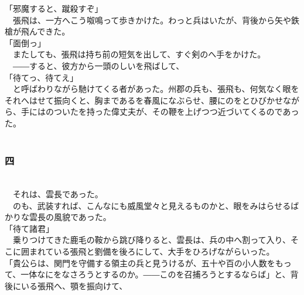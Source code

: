 \documentclass[
  paper=a5,
  fontsize=10pt,
  jafontsize=9.5pt,
  tate,                  %
  open_bracket_pos=nibu, %
]{jlreq}
\begin{document}
「邪魔すると、蹴殺すぞ」\\


　張飛は、一方へこう呶鳴って歩きかけた。わっと兵はいたが、背後から矢や鉄槍が飛んできた。\\


「面倒っ」\\


　またしても、張飛は持ち前の短気を出して、すぐ剣のへ手をかけた。\\


　――すると、彼方から一頭のしいを飛ばして、\\


「待てっ、待てえ」\\


　と呼ばわりながら馳けてくる者があった。州郡の兵も、張飛も、何気なく眼をそれへはせて振向くと、胸まであるを春風になぶらせ、腰にのをとひびかせながら、手にはのついたを持った偉丈夫が、その鞭を上げつつ近づいてくるのであった。\\

\\

\subsubsection{四}

\\


　それは、雲長であった。\\


　のも、武装すれば、こんなにも威風堂々と見えるものかと、眼をみはらせるばかりな雲長の風貌であった。\\


「待て諸君」\\


　乗りつけてきた鹿毛の鞍から跳び降りると、雲長は、兵の中へ割って入り、そこに囲まれている張飛と劉備を後ろにして、大手をひろげながらいった。\\


「貴公らは、関門を守備する領主の兵と見うけるが、五十や百の小人数をもって、一体なにをなさろうとするのか。――このを召捕ろうとするならば」と、背後にいる張飛へ、顎を振向けて、\\
\end{document}
